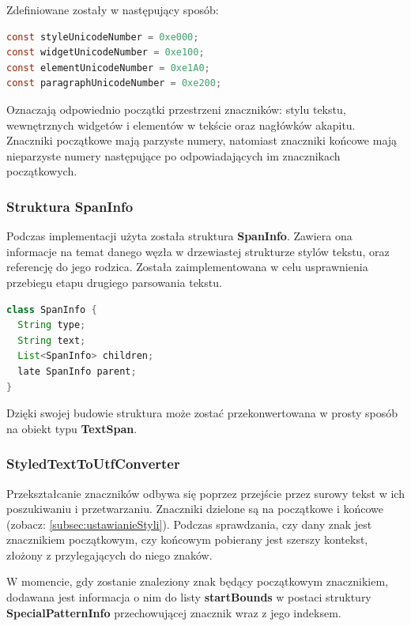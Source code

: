 \noindent Zdefiniowane zostały w następujący sposób:

\begin{lstlisting}[language=java]
const styleUnicodeNumber = 0xe000;
const widgetUnicodeNumber = 0xe100;
const elementUnicodeNumber = 0xe1A0;
const paragraphUnicodeNumber = 0xe200;
\end{lstlisting}

Oznaczają odpowiednio początki przestrzeni znaczników: stylu tekstu, wewnętrznych widgetów i elementów w tekście oraz nagłówków akapitu.
Znaczniki początkowe mają parzyste numery, natomiast znaczniki końcowe mają nieparzyste numery następujące po odpowiadających im znacznikach początkowych.


\subsubsection{Struktura SpanInfo}

Podczas implementacji użyta została struktura \textbf{SpanInfo}. Zawiera ona informacje na temat danego węzła w drzewiastej strukturze stylów tekstu, oraz referencję do jego rodzica.
Została zaimplementowana w celu usprawnienia przebiegu etapu drugiego parsowania tekstu.

\begin{lstlisting}[language=java]
class SpanInfo {
  String type;
  String text;
  List<SpanInfo> children;
  late SpanInfo parent;
}
\end{lstlisting}

Dzięki swojej budowie struktura może zostać przekonwertowana w prosty sposób na obiekt typu \textbf{TextSpan}.

\subsubsection{StyledTextToUtfConverter}

Przekształcanie znaczników odbywa się poprzez przejście przez surowy tekst w ich poszukiwaniu i przetwarzaniu. Znaczniki dzielone są na początkowe i końcowe (zobacz: \ref{subsec:ustawianieStyli}). Podczas sprawdzania, czy dany znak jest znacznikiem początkowym, czy końcowym pobierany jest szerszy kontekst, złożony z przylegających do niego znaków.

W momencie, gdy zostanie znaleziony znak będący początkowym znacznikiem, dodawana jest informacja o nim do listy \textbf{startBounds} w postaci struktury \textbf{SpecialPatternInfo} przechowującej znacznik wraz z jego indeksem.

